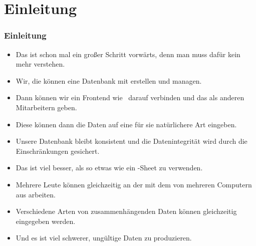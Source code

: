 \documentclass[aspectratio=169,mathserif,notheorems]{beamer}%
\subtitle{21.~Fabrik-Datenbank:~Formulare in LibreOffice Base}%
\begin{document}
%
%
\startPresentation%
%
\section{Einleitung}%
%
\begin{frame}%
\frametitle{Einleitung}%
%
\begin{itemize}%
%
%
%
%
\item<3-> Das ist schon mal ein großer Schritt vorwärts, denn man muss dafür kein  mehr verstehen.%
%
\item<4-> Wir, die  können eine Datenbank mit  erstellen und managen.%
%
\item<5-> Dann können wir ein Frontend wie \libreofficeBase\ darauf verbinden und das als  anderen Mitarbeitern geben.%
%
\item<6-> Diese können dann die Daten auf eine für sie natürlichere Art eingeben.%
%
\item<7-> Unsere Datenbank bleibt konsistent und die Datenintegrität wird durch die Einschränkungen gesichert.%
%
\item<8-> Das ist viel besser, als so etwas wie ein \microsoftExcel-Sheet zu verwenden.%
%
\item<9-> Mehrere Leute können gleichzeitig an der  mit dem  von mehreren Computern aus arbeiten.%
%
\item<10-> Verschiedene Arten von zusammenhängenden Daten können gleichzeitig eingegeben werden.%
%
\item<11-> Und es ist viel schwerer, ungültige Daten zu produzieren.%
\end{itemize}%
\end{frame}%
%
%
\end{document}
